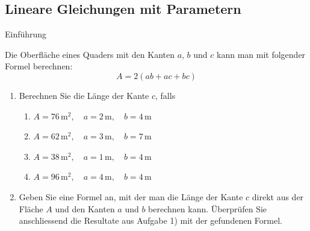 \subsection{Lineare Gleichungen mit Parametern}
\begin{LA}
    {Einführung}{}
    \begin{center}
    \end{center}

    Die Oberfläche eines Quaders mit den Kanten \(a\), \(b\) und \(c\) kann man mit folgender Formel berechnen:
    \[
        A = 2(ab+ac+bc)
    \]

    \begin{enumerate}
        \item Berechnen Sie die Länge der Kante \(c\), falls
              \begin{enumerate}
                  \item \(A=76\,\mathrm{m}^2,\quad a=2\,\mathrm{m},\quad b=4\,\mathrm{m}\)
                  \item \(A=62\,\mathrm{m}^2,\quad a=3\,\mathrm{m},\quad b=7\,\mathrm{m}\)
                  \item \(A=38\,\mathrm{m}^2,\quad a=1\,\mathrm{m},\quad b=4\,\mathrm{m}\)
                  \item \(A=96\,\mathrm{m}^2,\quad a=4\,\mathrm{m},\quad b=4\,\mathrm{m}\)
              \end{enumerate}

        \item Geben Sie eine Formel an, mit der man die Länge der Kante \(c\) direkt aus der Fläche \(A\) und den Kanten \(a\) und \(b\) berechnen kann. Überprüfen Sie anschliessend die Resultate aus Aufgabe 1) mit der gefundenen Formel.
    \end{enumerate}
\end{LA}





